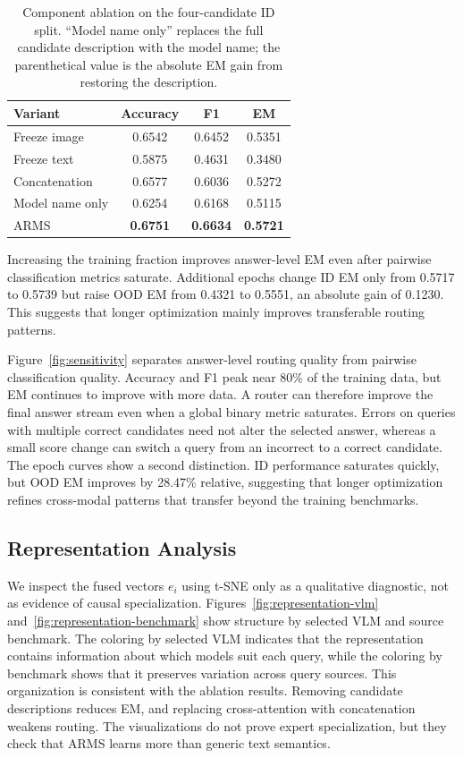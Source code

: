 \documentclass[letterpaper]{article}
\begin{document}
\begin{table}[t]
\centering
\setlength{\tabcolsep}{4pt}
\begin{tabular}{lccc}
\toprule
Variant & Accuracy & F1 & EM\\
\midrule
Freeze image               & 0.6542 & 0.6452 & 0.5351\\
Freeze text                & 0.5875 & 0.4631 & 0.3480\\
Concatenation              & 0.6577 & 0.6036 & 0.5272\\
Model name only            & 0.6254 & 0.6168 & 0.5115\\
ARMS                       & \textbf{0.6751} & \textbf{0.6634}
                           & \textbf{0.5721}\\
\bottomrule
\end{tabular}
\vspace{-3mm}
\caption{Component ablation on the four-candidate ID split. ``Model name only''
replaces the full candidate description with the model name; the parenthetical
value is the absolute EM gain from restoring the description.}
\label{tab:ablation}
\end{table}

Increasing the training fraction improves answer-level EM even after pairwise
classification metrics saturate. Additional epochs change ID EM only from
0.5717 to 0.5739 but raise OOD EM from 0.4321 to 0.5551, an absolute gain of
0.1230. This suggests that longer optimization mainly improves
transferable routing patterns.

Figure~\ref{fig:sensitivity} separates answer-level routing quality from
pairwise classification quality. Accuracy and F1 peak near 80\% of the training
data, but EM continues to improve with more data. A router can therefore improve
the final answer stream even when a global binary metric saturates. Errors on
queries with multiple correct candidates need not alter the selected answer,
whereas a small score change can switch a query from an incorrect to a correct
candidate. The epoch curves show a second distinction. ID performance saturates
quickly, but OOD EM improves by 28.47\% relative, suggesting that longer
optimization refines cross-modal patterns that transfer beyond the training
benchmarks.

\subsection{Representation Analysis}

We inspect the fused vectors $e_i$ using t-SNE only as a qualitative diagnostic,
not as evidence of causal specialization. Figures~\ref{fig:representation-vlm}
and~\ref{fig:representation-benchmark} show structure by selected VLM and source
benchmark. The coloring by selected VLM indicates that the representation
contains information about which models suit each query, while the coloring by
benchmark shows that it preserves variation across query sources. This
organization is consistent with
the ablation results. Removing candidate descriptions reduces EM, and replacing
cross-attention with concatenation weakens routing. The visualizations do not
prove expert specialization, but they check that ARMS learns more than generic
text semantics.
\end{document}
